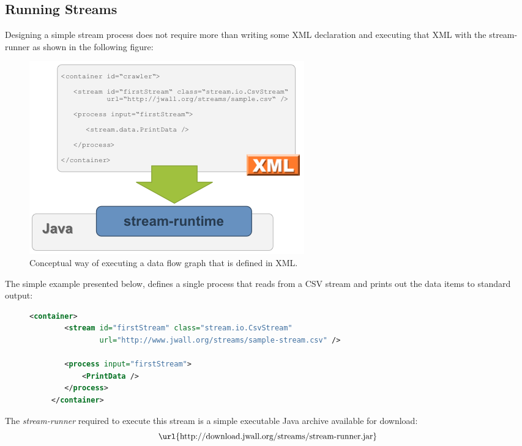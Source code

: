 \subsection{Running Streams}
Designing a simple stream process does not require more than writing
some XML declaration and executing that XML with the stream-runner as
shown in the following figure:

\begin{figure}[h!]
  \centering
  \includegraphics[scale=0.3]{graphics/quickstart-xml}
  \caption{\label{fig:quickstart}Conceptual way of executing a data flow graph that is defined in XML.}
\end{figure}

The simple example presented below, defines a single process that
reads from a CSV stream and prints out the data items to standard
output:

\begin{figure}[h!]
  \centering
  \begin{lstlisting}[language=XML]
    <container>
        <stream id="firstStream" class="stream.io.CsvStream"
                url="http://www.jwall.org/streams/sample-stream.csv" />

        <process input="firstStream">
            <PrintData />
        </process>
     </container>
  \end{lstlisting}
\end{figure}

The {\em stream-runner} required to execute this stream is a simple executable
Java archive available for download:
\begin{displaymath}
  \mbox{\url{http://download.jwall.org/streams/stream-runner.jar}}
\end{displaymath}


